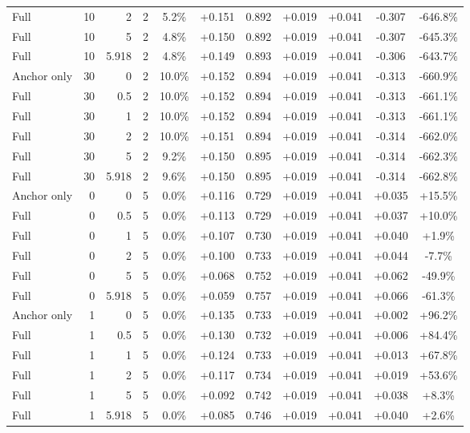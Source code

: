 \begin{table}[htbp]
\begin{tabular}{lrrrccccccc}
Full & 10 & 2 & 2 & 5.2\% & +0.151 & 0.892 & +0.019 & +0.041 & -0.307 & -646.8\% \\
Full & 10 & 5 & 2 & 4.8\% & +0.150 & 0.892 & +0.019 & +0.041 & -0.307 & -645.3\% \\
Full & 10 & 5.918 & 2 & 4.8\% & +0.149 & 0.893 & +0.019 & +0.041 & -0.306 & -643.7\% \\
Anchor only & 30 & 0 & 2 & 10.0\% & +0.152 & 0.894 & +0.019 & +0.041 & -0.313 & -660.9\% \\
Full & 30 & 0.5 & 2 & 10.0\% & +0.152 & 0.894 & +0.019 & +0.041 & -0.313 & -661.1\% \\
Full & 30 & 1 & 2 & 10.0\% & +0.152 & 0.894 & +0.019 & +0.041 & -0.313 & -661.1\% \\
Full & 30 & 2 & 2 & 10.0\% & +0.151 & 0.894 & +0.019 & +0.041 & -0.314 & -662.0\% \\
Full & 30 & 5 & 2 & 9.2\% & +0.150 & 0.895 & +0.019 & +0.041 & -0.314 & -662.3\% \\
Full & 30 & 5.918 & 2 & 9.6\% & +0.150 & 0.895 & +0.019 & +0.041 & -0.314 & -662.8\% \\
Anchor only & 0 & 0 & 5 & 0.0\% & +0.116 & 0.729 & +0.019 & +0.041 & +0.035 & +15.5\% \\
Full & 0 & 0.5 & 5 & 0.0\% & +0.113 & 0.729 & +0.019 & +0.041 & +0.037 & +10.0\% \\
Full & 0 & 1 & 5 & 0.0\% & +0.107 & 0.730 & +0.019 & +0.041 & +0.040 & +1.9\% \\
Full & 0 & 2 & 5 & 0.0\% & +0.100 & 0.733 & +0.019 & +0.041 & +0.044 & -7.7\% \\
Full & 0 & 5 & 5 & 0.0\% & +0.068 & 0.752 & +0.019 & +0.041 & +0.062 & -49.9\% \\
Full & 0 & 5.918 & 5 & 0.0\% & +0.059 & 0.757 & +0.019 & +0.041 & +0.066 & -61.3\% \\
Anchor only & 1 & 0 & 5 & 0.0\% & +0.135 & 0.733 & +0.019 & +0.041 & +0.002 & +96.2\% \\
Full & 1 & 0.5 & 5 & 0.0\% & +0.130 & 0.732 & +0.019 & +0.041 & +0.006 & +84.4\% \\
Full & 1 & 1 & 5 & 0.0\% & +0.124 & 0.733 & +0.019 & +0.041 & +0.013 & +67.8\% \\
Full & 1 & 2 & 5 & 0.0\% & +0.117 & 0.734 & +0.019 & +0.041 & +0.019 & +53.6\% \\
Full & 1 & 5 & 5 & 0.0\% & +0.092 & 0.742 & +0.019 & +0.041 & +0.038 & +8.3\% \\
Full & 1 & 5.918 & 5 & 0.0\% & +0.085 & 0.746 & +0.019 & +0.041 & +0.040 & +2.6\% \\

\end{tabular}
\end{table}
